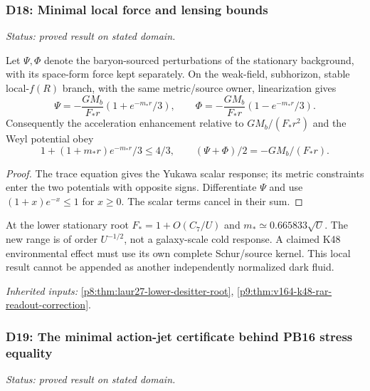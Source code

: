 \documentclass[12pt,a4paper]{article}
\begin{document}
\subsubsection{D18: Minimal local force and lensing bounds}
\label{p8:sec:v2201-derived-d18}
\noindent\textit{Status: proved result on stated domain.}

Let $\Psi,\Phi$ denote the baryon-sourced perturbations of the stationary
background, with its space-form force kept separately. On the weak-field,
subhorizon, stable local-$f(R)$ branch, with the same metric/source owner,
linearization gives
\[
 \Psi=-\frac{GM_b}{F_*r}(1+e^{-m_*r}/3),\qquad
 \Phi=-\frac{GM_b}{F_*r}(1-e^{-m_*r}/3).
\]
Consequently the acceleration enhancement relative to $GM_b/(F_*r^2)$
and the Weyl potential obey
\[
 1+(1+m_*r)e^{-m_*r}/3\le4/3,\qquad
 (\Psi+\Phi)/2=-GM_b/(F_*r).
\]
\begin{proof}
The trace equation gives the Yukawa scalar response; its
metric constraints enter the two potentials with opposite signs. Differentiate
$\Psi$ and use $(1+x)e^{-x}\le1$ for $x\ge0$. The scalar terms cancel in
their sum.
\end{proof}
At the lower stationary root $F_*=1+O(C_7/U)$ and
$m_*\simeq0.665833\sqrt U$. The new range is of order $U^{-1/2}$, not
a galaxy-scale cold response. A claimed K48 environmental effect must use
its own complete Schur/source kernel. This local result cannot be appended
as another independently normalized dark fluid.
\par\noindent\textit{Inherited inputs:} \ref{p8:thm:laur27-lower-desitter-root}, \ref{p9:thm:v164-k48-rar-readout-correction}.

\subsubsection{D19: The minimal action-jet certificate behind PB16 stress equality}
\label{p8:sec:v2201-derived-d19}
\noindent\textit{Status: proved result on stated domain.}
\end{document}
